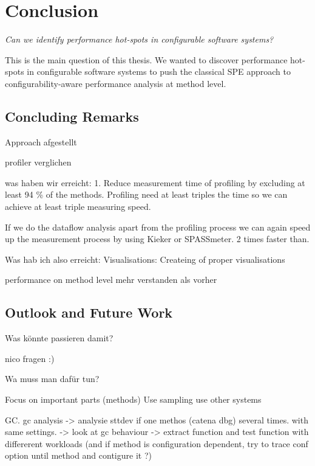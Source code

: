 \chapter{Conclusion}
\label{chap:conlusion}

\centerline{\emph{Can we identify performance hot-spots in configurable software systems?}}

This is the main question of this thesis. We wanted to discover performance hot-spots in configurable software systems to push the classical \ac{SPE} approach to configurability-aware performance analysis at method level.

\section{Concluding Remarks}



Approach afgestellt

profiler verglichen




was haben wir erreicht:
1. Reduce measurement time of profiling by excluding at least 94 \% of the methods. Profiling need at least triples the time so we can achieve at least triple measuring speed.

If we do the dataflow analysis apart from the profiling process we can again speed up the measurement process by using Kieker or SPASSmeter. 2 times faster than.

Was hab ich also erreicht:
Visualisations:
Createing of proper visualisations


performance on method level mehr verstanden als vorher

\section{Outlook and Future Work}

Was könnte passieren damit?


nico fragen :)





Wa muss man dafür tun?

Focus on important parts (methods)
Use sampling
use other systems






GC.
gc analysis -> analysie sttdev if one methos (catena dbg) several times. with same settings. -> look at gc behaviour -> extract function and test function with differerent workloads (and if method is configuration dependent, try to trace conf option until method and contigure it ?)

